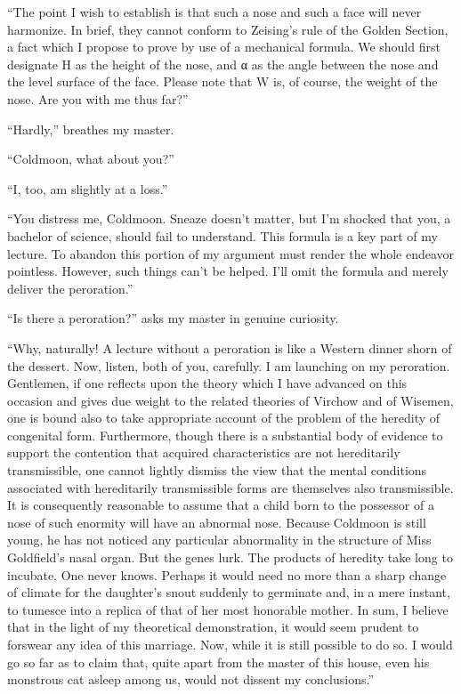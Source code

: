 \documentclass[12pt, openright]{book}
\begin{document}
``The point I wish to establish is that such a nose and such a face will
never harmonize. In brief, they cannot conform to Zeising's rule of the
Golden Section, a fact which I propose to prove by use of a mechanical
formula. We should first designate H as the height of the nose, and α as
the angle between the nose and the level surface of the face. Please
note that W is, of course, the weight of the nose. Are you with me thus
far?''

``Hardly,'' breathes my master.

``Coldmoon, what about you?''

``I, too, am slightly at a loss.''

``You distress me, Coldmoon. Sneaze doesn't matter, but I'm shocked that
you, a bachelor of science, should fail to understand. This formula is a
key part of my lecture. To abandon this portion of my argument must
render the whole endeavor pointless. However, such things can't be
helped. I'll omit the formula and merely deliver the peroration.''

``Is there a peroration?'' asks my master in genuine curiosity.

``Why, naturally! A lecture without a peroration is like a Western
dinner shorn of the dessert. Now, listen, both of you, carefully. I am
launching on my peroration. Gentlemen, if one reflects upon the theory
which I have advanced on this occasion and gives due weight to the
related theories of Virchow and of Wisemen, one is bound also to take
appropriate account of the problem of the heredity of congenital form.
Furthermore, though there is a substantial body of evidence to support
the contention that acquired characteristics are not hereditarily
transmissible, one cannot lightly dismiss the view that the mental
conditions associated with hereditarily transmissible forms are
themselves also transmissible. It is consequently reasonable to assume
that a child born to the possessor of a nose of such enormity will have
an abnormal nose. Because Coldmoon is still young, he has not noticed
any particular abnormality in the structure of Miss Goldfield's nasal
organ. But the genes lurk. The products of heredity take long to
incubate. One never knows. Perhaps it would need no more than a sharp
change of climate for the daughter's snout suddenly to germinate and, in
a mere instant, to tumesce into a replica of that of her most honorable
mother. In sum, I believe that in the light of my theoretical
demonstration, it would seem prudent to forswear any idea of this
marriage. Now, while it is still possible to do so. I would go so far as
to claim that, quite apart from the master of this house, even his
monstrous cat asleep among us, would not dissent my conclusions.''
\end{document}

